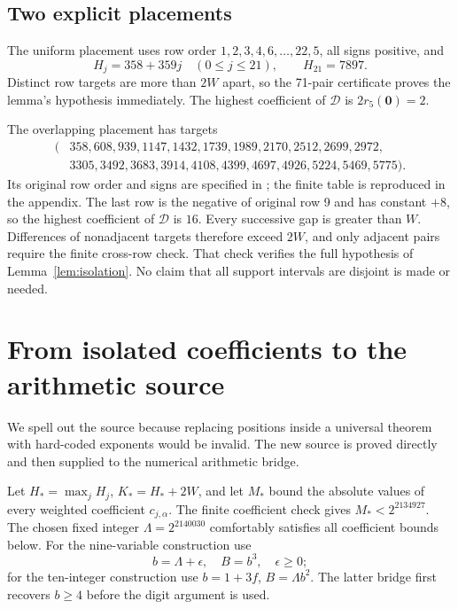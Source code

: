 \documentclass[11pt]{article}
\newcommand{\file}[1]{\texttt{\small\detokenize{#1}}}
\theoremstyle{definition}\newtheorem{definition}[theorem]{Definition}
\theoremstyle{remark}\newtheorem{remark}[theorem]{Remark}
\begin{document}
\subsection{Two explicit placements}
The uniform placement uses row order
$1,2,3,4,6,\ldots,22,5$, all signs positive, and
\[
 H_j=358+359j\quad(0\le j\le21),\qquad H_{21}=7897.
\]
Distinct row targets are more than $2W$ apart, so the 71-pair certificate
proves the lemma's hypothesis immediately. The highest coefficient of
$\mathcal D$ is $2r_5(\mathbf0)=2$.

The overlapping placement has targets
\begin{equation}\label{eq:overlap}
\begin{split}
(&358,608,939,1147,1432,1739,1989,2170,2512,2699,2972,\\
 &3305,3492,3683,3914,4108,4399,4697,4926,5224,5469,5775).
\end{split}
\end{equation}
Its original row order and signs are specified in
\file{data/overlap_layout.json}; the finite table is reproduced in the
appendix. The last row is the negative of original row 9 and has constant
$+8$, so the highest coefficient of $\mathcal D$ is $16$.
Every successive gap is greater than $W$. Differences of nonadjacent
targets therefore exceed $2W$, and only adjacent pairs require the finite
cross-row check. That check verifies the full hypothesis of
Lemma~\ref{lem:isolation}. No claim that all support intervals are disjoint
is made or needed.

\section{From isolated coefficients to the arithmetic source}
\label{sec:source}
We spell out the source because replacing positions inside a universal
theorem with hard-coded exponents would be invalid. The new source is
proved directly and then supplied to the numerical arithmetic bridge.

Let $H_*=\max_jH_j$, $K_*=H_*+2W$, and let $M_*$ bound the absolute values
of every weighted coefficient $c_{j,\alpha}$. The finite coefficient check
gives $M_*<2^{2134927}$. The chosen fixed integer
$\Lambda=2^{2140030}$ comfortably satisfies all coefficient bounds below.
For the nine-variable construction use
\[
 b=\Lambda+\epsilon,\quad B=b^3,\quad\epsilon\ge0;
\]
for the ten-integer construction use $b=1+3f$, $B=\Lambda b^2$.
The latter bridge first recovers $b\ge4$ before the digit argument is used.
\end{document}
